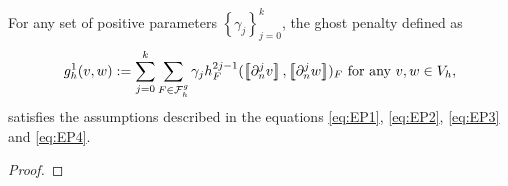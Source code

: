 \begin{proposition}
    For any set of positive parameters $\left\{ \gamma _{j} \right\} _{j=0}^{k}$, the ghost penalty defined as \[
    g^{1}_{h}( v,w)  := \sum_{j=0}^{k} \sum_{F \in \mathcal{F} _{h}^{g}}^{} \gamma _{j} h^{2j-1}_{F} ( \jump{ \partial ^{j}_{n} v }, \jump{ \partial ^{j}_{n} w }  ) _{F} \text{ for any } v,w \in V_{h},
    \]
    satisfies the assumptions described in the equations \eqref{eq:EP1}, \eqref{eq:EP2}, \eqref{eq:EP3} and \eqref{eq:EP4}.
\end{proposition}

\begin{proof}
\end{proof}



